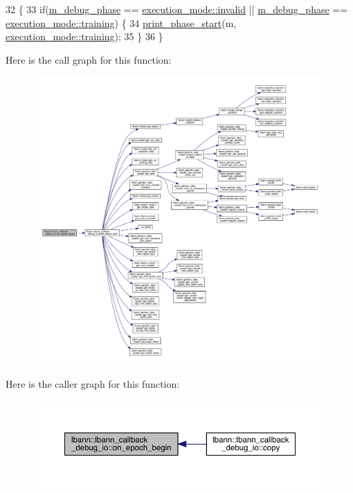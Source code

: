 \begin{DoxyCode}
32                                                           \{
33   \textcolor{keywordflow}{if}(\hyperlink{classlbann_1_1lbann__callback__debug__io_add73fbc786ca9284fa3399a7e99d0b1f}{m\_debug\_phase} == \hyperlink{base_8hpp_a2781a159088df64ed7d47cc91c4dc0a8afedb2d84cafe20862cb4399751a8a7e3}{execution\_mode::invalid} || 
      \hyperlink{classlbann_1_1lbann__callback__debug__io_add73fbc786ca9284fa3399a7e99d0b1f}{m\_debug\_phase} == \hyperlink{base_8hpp_a2781a159088df64ed7d47cc91c4dc0a8ac185ddac8b5a8f5aa23c5b80bc12d214}{execution\_mode::training}) \{
34     \hyperlink{classlbann_1_1lbann__callback__debug__io_a528f4aea5f657f40b27c58a164d4095a}{print\_phase\_start}(m, \hyperlink{base_8hpp_a2781a159088df64ed7d47cc91c4dc0a8ac185ddac8b5a8f5aa23c5b80bc12d214}{execution\_mode::training});
35   \}
36 \}
\end{DoxyCode}
Here is the call graph for this function\+:\nopagebreak
\begin{figure}[H]
\begin{center}
\leavevmode
\includegraphics[width=350pt]{classlbann_1_1lbann__callback__debug__io_aa3d2a6fb4d7375c05ece0058224ea792_cgraph}
\end{center}
\end{figure}
Here is the caller graph for this function\+:\nopagebreak
\begin{figure}[H]
\begin{center}
\leavevmode
\includegraphics[width=350pt]{classlbann_1_1lbann__callback__debug__io_aa3d2a6fb4d7375c05ece0058224ea792_icgraph}
\end{center}
\end{figure}
